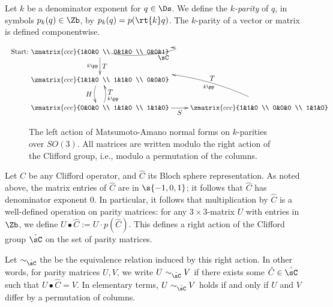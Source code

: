 \documentclass{article}
\begin{document}
\begin{definition}[$k$-parity]
  Let $k$ be a denominator exponent for $q\in\Ds$. We define the {\em
    $k$-parity} of $q$, in symbols $p_k(q)\in\Zb$, by $p_k(q) =
  p(\rt{k} q)$.  The $k$-parity of a vector or
  matrix is defined componentwise.
\end{definition}

\begin{figure}
  \[
  \xymatrix{
    *+{\makebox[0in][r]{Start:~}\zmatrix{ccc}{1&0&0 \\ 0&1&0 \\ 0&0&1}}
    \ar[d]^<>(.5){\displaystyle T}_<>(.5){k\pp}
    \ar@<1.5ex>@(dr,r)[]+R_<>(.53){\displaystyle \sC}
    \\
    *+{\zmatrix{ccc}{1&1&0 \\ 1&1&0 \\ 0&0&0}}
    \ar@<-0.5ex>@/_/[d]_<>(.5){\displaystyle H}
    \\
    *+{\zmatrix{ccc}{0&0&0 \\ 1&1&0 \\ 1&1&0}}
    \ar[r]_<>(.5){\displaystyle S}
    \ar@<-0.5ex>@/_/[u]_<>(.6){\displaystyle T}_<>(.25){k\pp}
    &
    *+{\zmatrix{ccc}{1&1&0 \\ 0&0&0 \\ 1&1&0}}
    \ar@<-2ex>@/_4ex/[ul]_<>(.5){\displaystyle T}^<>(.5){k\pp}
  }
  \]
  \caption{The left action of Matsumoto-Amano normal forms on
    $k$-parities over $SO(3)$. All matrices are written modulo the
    right action of the Clifford group, i.e., modulo a permutation of
    the columns.}\label{fig-so3-action}
\end{figure}

\begin{remark}\label{rem-right-action}
  Let $C$ be any Clifford operator, and $\hat C$ its Bloch sphere
  representation. As noted above, the matrix entries of $\hat C$ are
  in $\s{-1,0,1}$; it follows that $\hat C$ has denominator exponent
  0. In particular, it follows that multiplication by $\hat C$ is a
  well-defined operation on parity matrices: for any $3\times
  3$-matrix $U$ with entries in $\Zb$, we define $U\bullet \hat C :=
  U\cdot p(\hat C)$. This defines a right action of the Clifford group
  $\hat\sC$ on the set of parity matrices.
\end{remark}

\begin{definition}\label{def-simg}
  Let $\sim_{\hat\sC}$ the be the equivalence relation induced by this
  right action. In other words, for parity matrices $U,V$, we write
  $U\sim_{\hat\sC} V$ if there exists some $\hat C\in \hat\sC$ such
  that $U\bullet \hat C=V$. In elementary terms, $U\sim_{\hat\sC} V$
  holds if and only if $U$ and $V$ differ by a permutation of columns.
\end{definition}
\end{document}
